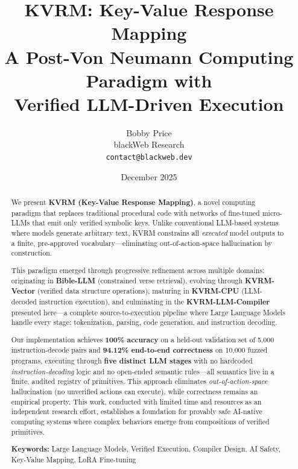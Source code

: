 \documentclass[11pt,a4paper]{article}
\title{%
    \textbf{KVRM: Key-Value Response Mapping} \\[0.5em]
    \Large A Post-Von Neumann Computing Paradigm with \\
    Verified LLM-Driven Execution
}
\author{
    Bobby Price \\
    blackWeb Research \\
    \texttt{contact@blackweb.dev}
}
\date{December 2025}
\begin{document}
\maketitle

\begin{abstract}
We present \textbf{KVRM (Key-Value Response Mapping)}, a novel computing paradigm that replaces traditional procedural code with networks of fine-tuned micro-LLMs that emit only verified symbolic keys. Unlike conventional LLM-based systems where models generate arbitrary text, KVRM constrains all \textit{executed} model outputs to a finite, pre-approved vocabulary---eliminating out-of-action-space hallucination by construction.

This paradigm emerged through progressive refinement across multiple domains: originating in \textbf{Bible-LLM} (constrained verse retrieval), evolving through \textbf{KVRM-Vector} (verified data structure operations), maturing in \textbf{KVRM-CPU} (LLM-decoded instruction execution), and culminating in the \textbf{KVRM-LLM-Compiler} presented here---a complete source-to-execution pipeline where Large Language Models handle every stage: tokenization, parsing, code generation, and instruction decoding.

Our implementation achieves \textbf{100\% accuracy} on a held-out validation set of 5,000 instruction-decode pairs and \textbf{94.12\% end-to-end correctness} on 10,000 fuzzed programs, executing through \textbf{five distinct LLM stages} with no hardcoded \textit{instruction-decoding} logic and no open-ended semantic rules---all semantics live in a finite, audited registry of primitives. This approach eliminates \textit{out-of-action-space} hallucination (no unverified actions can execute), while correctness remains an empirical property. This work, conducted with limited time and resources as an independent research effort, establishes a foundation for provably safe AI-native computing systems where complex behaviors emerge from compositions of verified primitives.

\textbf{Keywords:} Large Language Models, Verified Execution, Compiler Design, AI Safety, Key-Value Mapping, LoRA Fine-tuning
\end{abstract}

\end{document}

